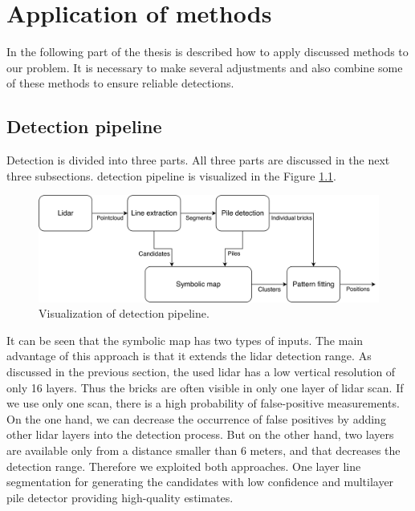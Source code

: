 \chapter{Application of methods}
In the following part of the thesis is described how to apply discussed methods to our problem. It is necessary to make several adjustments and also combine some of these methods to ensure reliable detections.

\section{Detection pipeline}
Detection is divided into three parts. All three parts are discussed in the next three subsections. detection pipeline is visualized in the Figure \ref{fig:flowchart}. 

\hspace{5px}
\begin{figure}[H]
\centering
\includegraphics[scale=0.06]{fig/flowchart.pdf}
\caption[Program pipeline]{Visualization of detection pipeline.}
\label{fig:flowchart}
\end{figure}

It can be seen that the symbolic map has two types of inputs. The main advantage of this approach is that it extends the lidar detection range. As discussed in the previous section, the used lidar has a low vertical resolution of only 16 layers. Thus the bricks are often visible in only one layer of lidar scan. If we use only one scan, there is a high probability of false-positive measurements. On the one hand, we can decrease the occurrence of false positives by adding other lidar layers into the detection process. But on the other hand, two layers are available only from a distance smaller than 6 meters, and that decreases the detection range. Therefore we exploited both approaches. One layer line segmentation for generating the candidates with low confidence and multilayer pile detector providing high-quality estimates.

